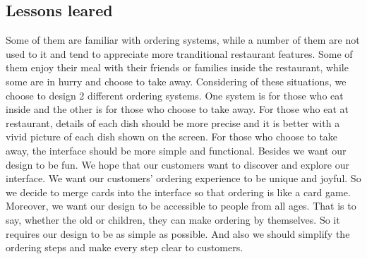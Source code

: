 \documentclass[a4paper,12pt]{article}
\begin{document}
\subsection{Lessons leared}

Some of them are familiar with ordering systems, while a number of them are not used to it and tend to appreciate
more tranditional restaurant features. Some of them enjoy their meal with their friends or families inside the
restaurant, while some are in hurry and choose to take away. Considering of these situations, we choose to design
2 different ordering systems. One system is for those who eat inside and the other is for those who choose to take
away. For those who eat at restaurant, details of each dish should be more precise and it is better with a vivid
picture of each dish shown on the screen. For those who choose to take away, the interface should be more simple
and functional. Besides we want our design to be fun. We hope that our customers want to discover and explore our
interface. We want our customers’ ordering experience to be unique and joyful. So we decide to merge cards into the
interface so that ordering is like a card game. Moreover, we want our design to be accessible to people from all
ages. That is to say, whether the old or children, they can make ordering by themselves. So it requires our design
to be as simple as possible. And also we should simplify the ordering steps and make every step clear to customers.
\end{document}

